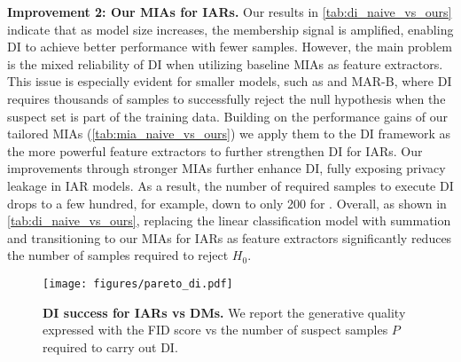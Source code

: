 \textbf{Improvement 2: Our MIAs for IARs.}
Our results in \cref{tab:di_naive_vs_ours} indicate that as model size increases, the membership signal is amplified, enabling DI to achieve better performance with fewer samples. However, the main problem is the mixed reliability of DI when utilizing baseline MIAs as feature extractors. This issue is especially evident for smaller models, such as \varsmall and MAR-B, where DI requires thousands of samples to successfully reject the null hypothesis when the suspect set is part of the training data. Building on the performance gains of our tailored MIAs (\cref{tab:mia_naive_vs_ours}) we apply them to the DI framework as the more powerful feature extractors to further strengthen DI for IARs.
Our improvements through stronger MIAs further enhance DI, fully exposing privacy leakage in IAR models. As a result, the number of required samples to execute DI drops to a few hundred, for example, down to only 200 for \varsmall.
Overall, as shown in \cref{tab:di_naive_vs_ours}, replacing the linear classification model with summation and transitioning to our MIAs for IARs as feature extractors significantly reduces the number of samples required to reject \(H_0\).




\begin{wrapfigure}{r}{0.6\linewidth} %
    \vspace{-5pt}
    \centering
    \texttt{[image: figures/pareto\_di.pdf]}
    \vspace{-10pt}
    \caption{\textbf{DI success for IARs vs DMs.} We report the generative quality expressed with the FID score vs the number of suspect samples \(P\) required to carry out DI.} 
    \vspace{-5pt}
    \label{fig:pareto_di}
\end{wrapfigure}

